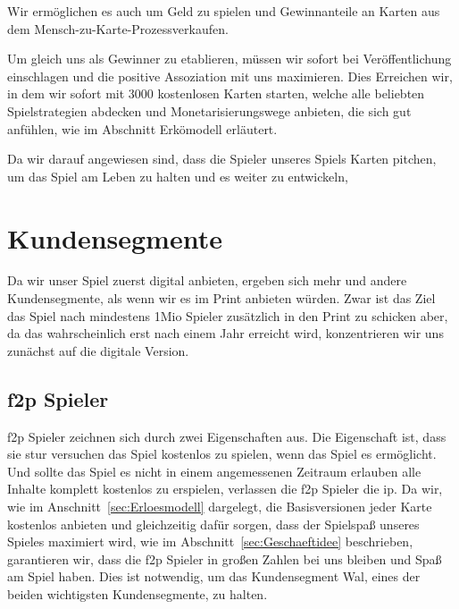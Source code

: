 \documentclass[fontsize=12, a4aper]{scrartcl}
\begin{document}
\noindent Wir ermöglichen es auch um Geld zu spielen und Gewinnanteile an Karten aus dem \glqq Mensch-zu-Karte-Prozess\grqq verkaufen.\hfill\newline

\noindent Um gleich uns als Gewinner zu etablieren, müssen wir sofort bei Veröffentlichung einschlagen und die positive Assoziation mit uns maximieren. Dies Erreichen wir, in dem wir sofort mit 3000 kostenlosen Karten starten, welche alle beliebten Spielstrategien abdecken und Monetarisierungswege anbieten, die sich gut anfühlen, wie im Abschnitt \glqq Erkömodell\grqq{} erläutert.\hfill\newline

\noindent Da wir darauf angewiesen sind, dass die Spieler unseres Spiels Karten pitchen, um das Spiel am Leben zu halten und es weiter zu entwickeln, 

\section{Kundensegmente} \label{sec:Kundensegmente}

Da wir unser Spiel zuerst digital anbieten, ergeben sich mehr und andere Kundensegmente, als wenn wir es im Print anbieten würden. Zwar ist das Ziel das Spiel nach mindestens 1Mio Spieler zusätzlich in den Print zu schicken aber, da das wahrscheinlich erst nach einem Jahr erreicht wird, konzentrieren wir uns zunächst auf die digitale Version.

\subsection{\acl{f2p} Spieler} \label{subsec:f2p_Spieler}

\acl{f2p} Spieler zeichnen sich durch zwei Eigenschaften aus. Die Eigenschaft ist, dass sie stur versuchen das Spiel kostenlos zu spielen, wenn das Spiel es ermöglicht. Und sollte das Spiel es nicht in einem angemessenen Zeitraum erlauben alle Inhalte komplett kostenlos zu erspielen, verlassen die \ac{f2p} Spieler die \ac{ip}. Da wir, wie im Anschnitt~\ref{sec:Erloesmodell} dargelegt, die Basisversionen jeder Karte kostenlos anbieten und gleichzeitig dafür sorgen, dass der Spielspaß unseres Spieles maximiert wird, wie im Abschnitt~\ref{sec:Geschaeftidee} beschrieben, garantieren wir, dass die \ac{f2p} Spieler in großen Zahlen bei uns bleiben und Spaß am Spiel haben. Dies ist notwendig, um das Kundensegment \glqq Wal\grqq, eines der beiden wichtigsten Kundensegmente, zu halten.\hfill\newline
\end{document}

